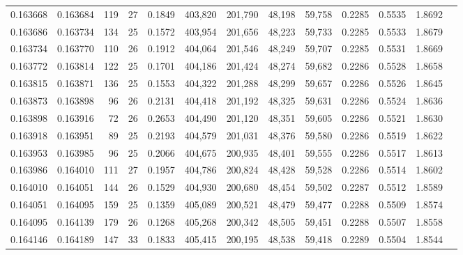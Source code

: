 \begin{tabular}{rrrrrrrrrrrrr}
0.163668 & 0.163684 & 119 &  27 &                                     0.1849 & 403,820 & 201,790 &  48,198 &  59,758 & 0.2285 & 0.5535 & 1.8692 \\
0.163686 & 0.163734 & 134 &  25 &                                     0.1572 & 403,954 & 201,656 &  48,223 &  59,733 & 0.2285 & 0.5533 & 1.8679 \\
0.163734 & 0.163770 & 110 &  26 &                                     0.1912 & 404,064 & 201,546 &  48,249 &  59,707 & 0.2285 & 0.5531 & 1.8669 \\
0.163772 & 0.163814 & 122 &  25 &                                     0.1701 & 404,186 & 201,424 &  48,274 &  59,682 & 0.2286 & 0.5528 & 1.8658 \\
0.163815 & 0.163871 & 136 &  25 &                                     0.1553 & 404,322 & 201,288 &  48,299 &  59,657 & 0.2286 & 0.5526 & 1.8645 \\
0.163873 & 0.163898 &  96 &  26 &                                     0.2131 & 404,418 & 201,192 &  48,325 &  59,631 & 0.2286 & 0.5524 & 1.8636 \\
0.163898 & 0.163916 &  72 &  26 &                                     0.2653 & 404,490 & 201,120 &  48,351 &  59,605 & 0.2286 & 0.5521 & 1.8630 \\
0.163918 & 0.163951 &  89 &  25 &                                     0.2193 & 404,579 & 201,031 &  48,376 &  59,580 & 0.2286 & 0.5519 & 1.8622 \\
0.163953 & 0.163985 &  96 &  25 &                                     0.2066 & 404,675 & 200,935 &  48,401 &  59,555 & 0.2286 & 0.5517 & 1.8613 \\
0.163986 & 0.164010 & 111 &  27 &                                     0.1957 & 404,786 & 200,824 &  48,428 &  59,528 & 0.2286 & 0.5514 & 1.8602 \\
0.164010 & 0.164051 & 144 &  26 &                                     0.1529 & 404,930 & 200,680 &  48,454 &  59,502 & 0.2287 & 0.5512 & 1.8589 \\
0.164051 & 0.164095 & 159 &  25 &                                     0.1359 & 405,089 & 200,521 &  48,479 &  59,477 & 0.2288 & 0.5509 & 1.8574 \\
0.164095 & 0.164139 & 179 &  26 &                                     0.1268 & 405,268 & 200,342 &  48,505 &  59,451 & 0.2288 & 0.5507 & 1.8558 \\
0.164146 & 0.164189 & 147 &  33 &                                     0.1833 & 405,415 & 200,195 &  48,538 &  59,418 & 0.2289 & 0.5504 & 1.8544 \\

\end{tabular}
